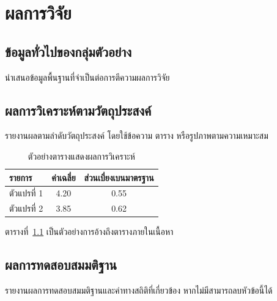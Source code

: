 \chapter{ผลการวิจัย}
\section{ข้อมูลทั่วไปของกลุ่มตัวอย่าง}
นำเสนอข้อมูลพื้นฐานที่จำเป็นต่อการตีความผลการวิจัย
\section{ผลการวิเคราะห์ตามวัตถุประสงค์}
รายงานผลตามลำดับวัตถุประสงค์ โดยใช้ข้อความ ตาราง หรือรูปภาพตามความเหมาะสม
\begin{table}[htbp]
  \centering
  \caption{ตัวอย่างตารางแสดงผลการวิเคราะห์}
  \label{tab:example-result}
  \begin{tabular}{|l|c|c|}
    \hline
    รายการ & ค่าเฉลี่ย & ส่วนเบี่ยงเบนมาตรฐาน \\
    \hline
    ตัวแปรที่ 1 & 4.20 & 0.55 \\
    \hline
    ตัวแปรที่ 2 & 3.85 & 0.62 \\
    \hline
  \end{tabular}
\end{table}
ตารางที่~\ref{tab:example-result} เป็นตัวอย่างการอ้างถึงตารางภายในเนื้อหา
\section{ผลการทดสอบสมมติฐาน}
รายงานผลการทดสอบสมมติฐานและค่าทางสถิติที่เกี่ยวข้อง หากไม่มีสามารถลบหัวข้อนี้ได้
